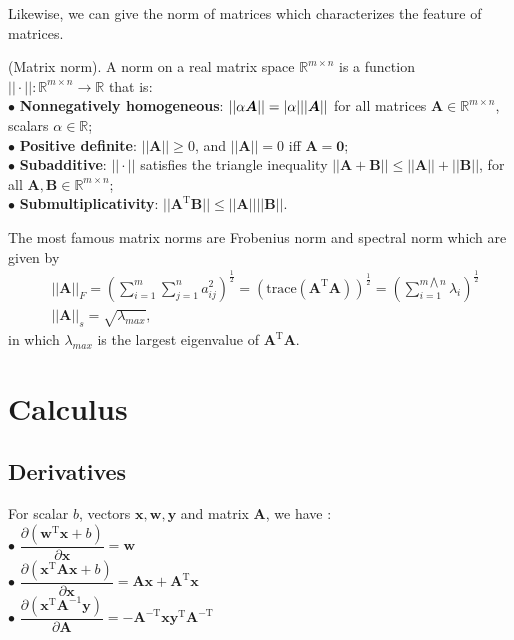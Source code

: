 \documentclass[10pt]{article}
\begin{document}
Likewise, we can give the norm of matrices which characterizes the feature of matrices. \\
\begin{definition}(Matrix norm).
A norm on a real matrix space $\mathbb{R}^{m\times n}$ is a function $||\cdot||: \mathbb{R}^{m\times n} \rightarrow \mathbb{R}$ that is:\\
$\bullet$ \textbf{Nonnegatively homogeneous}: $||\alpha \bm{A}||=\lvert\alpha\rvert||\bm{A}||$ for all matrices $\bm{A}\in \mathbb{R}^{m\times n}$, scalars $\alpha \in \mathbb{R}$;\\
$\bullet$ \textbf{Positive definite}: $||\bm{A}||\geq 0$, and $||\bm{A}|| =0$ iff $\bm{A}=\bm{0}$;\\
$\bullet$ \textbf{Subadditive}: $||\cdot||$ satisfies the triangle inequality $||\bm{A} + \bm{B}|| \leq ||\bm{A}|| + ||\bm{B}||$, for all $\bm{A}, \bm{B} \in \mathbb{R}^{m\times n}$;\\
$\bullet$ \textbf{Submultiplicativity}:  $||\bm{A}^{\mathrm{T}} \bm{B}|| \leq ||\bm{A}||||\bm{B}||$.

\end{definition}

The most famous matrix norms are Frobenius norm and spectral norm which are given by
\begin{align*}
    &||\bm{A}||_F = \left(\sum_{i=1}^{m}\sum_{j=1}^{n} a_{ij}^2\right)^{\frac{1}{2}}=\left(\mathrm{trace}(\bm{A}^{\mathrm{T}}\bm{A})\right)^{\frac{1}{2}}=\left(\sum_{i=1}^{m\bigwedge n} \lambda_i\right)^{\frac{1}{2}}\\
    &||\bm{A}||_s = \sqrt{\lambda_{max}},
\end{align*}
in which $\lambda_{max}$ is the largest eigenvalue of $\bm{A}^{\mathrm{T}}\bm{A}$.


\section{Calculus}
\subsection{Derivatives}
For scalar $b$,  vectors $\bm{x}, \bm{w}, \bm{y}$ and matrix $\bm{A}$, we have \cite{matrixcook}:\\
$\bullet$ $\dfrac{\partial(\bm{w}^{\mathrm{T}}\bm{x} + b)}{\partial\bm{x}} = \bm{w}$\\
$\bullet$ $\dfrac{\partial(\bm{x}^{\mathrm{T}}\bm{A}\bm{x} + b)}{\partial\bm{x}} = \bm{A}\bm{x}+\bm{A}^{\mathrm{T}}\bm{x}$\\
$\bullet$ $\dfrac{\partial (\bm{x}^{\mathrm{T}}\bm{A}^{-1}\bm{y})}{\partial\bm{A}} = -\bm{A}^{-\mathrm{T}}\bm{x}\bm{y}^{\mathrm{T}}\bm{A}^{-\mathrm{T}}$
\end{document}
